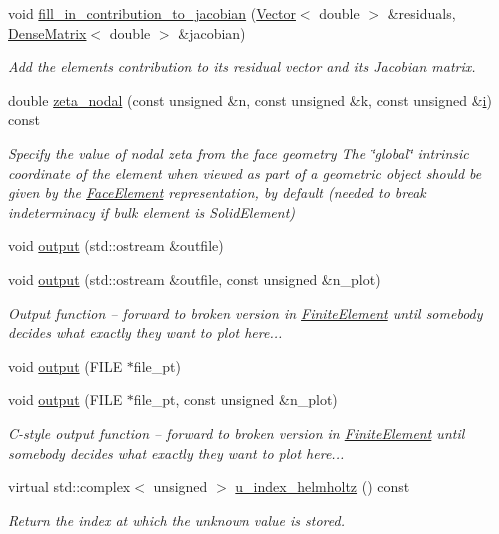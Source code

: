 \begin{DoxyCompactItemize}
void \hyperlink{classoomph_1_1HelmholtzFluxElement_ac388e1c565715ffc9953fc548def1bf5}{fill\+\_\+in\+\_\+contribution\+\_\+to\+\_\+jacobian} (\hyperlink{classoomph_1_1Vector}{Vector}$<$ double $>$ \&residuals, \hyperlink{classoomph_1_1DenseMatrix}{Dense\+Matrix}$<$ double $>$ \&jacobian)
\begin{DoxyCompactList}\small\item\em Add the element\textquotesingle{}s contribution to its residual vector and its Jacobian matrix. \end{DoxyCompactList}\item 
double \hyperlink{classoomph_1_1HelmholtzFluxElement_a02ce0bfabe6ce7ef3901bb4155806d86}{zeta\+\_\+nodal} (const unsigned \&n, const unsigned \&k, const unsigned \&\hyperlink{cfortran_8h_adb50e893b86b3e55e751a42eab3cba82}{i}) const
\begin{DoxyCompactList}\small\item\em Specify the value of nodal zeta from the face geometry The \char`\"{}global\char`\"{} intrinsic coordinate of the element when viewed as part of a geometric object should be given by the \hyperlink{classoomph_1_1FaceElement}{Face\+Element} representation, by default (needed to break indeterminacy if bulk element is Solid\+Element) \end{DoxyCompactList}\item 
void \hyperlink{classoomph_1_1HelmholtzFluxElement_a08f6410ef176312d00f5a5c13caa1b06}{output} (std\+::ostream \&outfile)
\item 
void \hyperlink{classoomph_1_1HelmholtzFluxElement_a8df42455a8d4584c1d67e8e0d7ab44a0}{output} (std\+::ostream \&outfile, const unsigned \&n\+\_\+plot)
\begin{DoxyCompactList}\small\item\em Output function -- forward to broken version in \hyperlink{classoomph_1_1FiniteElement}{Finite\+Element} until somebody decides what exactly they want to plot here... \end{DoxyCompactList}\item 
void \hyperlink{classoomph_1_1HelmholtzFluxElement_a8afbad47be6598b8a4a6776aa21bb38a}{output} (F\+I\+LE $\ast$file\+\_\+pt)
\item 
void \hyperlink{classoomph_1_1HelmholtzFluxElement_a125673c600acb76787db63810c51066d}{output} (F\+I\+LE $\ast$file\+\_\+pt, const unsigned \&n\+\_\+plot)
\begin{DoxyCompactList}\small\item\em C-\/style output function -- forward to broken version in \hyperlink{classoomph_1_1FiniteElement}{Finite\+Element} until somebody decides what exactly they want to plot here... \end{DoxyCompactList}\item 
virtual std\+::complex$<$ unsigned $>$ \hyperlink{classoomph_1_1HelmholtzFluxElement_ae3fb5779a0337f07a71bf8211ea403e3}{u\+\_\+index\+\_\+helmholtz} () const
\begin{DoxyCompactList}\small\item\em Return the index at which the unknown value is stored. \end{DoxyCompactList}\end{DoxyCompactItemize}

